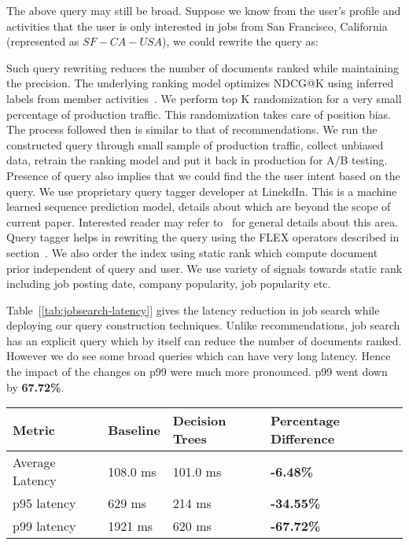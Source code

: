 
The above query may still be broad. Suppose we know from the user's profile and
activities that the user is only interested in jobs from San Francisco,
California (represented as $SF-CA-USA$), we could rewrite the query as:


Such query rewriting reduces the number of documents ranked while maintaining
the precision. The underlying ranking model optimizes NDCG@K using inferred
labels from member activities~\cite{liget}. We perform top K randomization for
a very small percentage of production traffic. This randomization takes care of
position bias. The process followed then is similar to that of recommendations.
We run the constructed query through small sample of production traffic,
collect unbiased data, retrain the ranking model and put it back in production
for A/B testing. Presence of query also implies that we could find the the user
intent based on the query. We use proprietary query tagger developer at
LinekdIn. This is a machine learned sequence prediction model, details about
which are beyond the scope of current paper. Interested reader may refer to~\cite{ashaolu2014query}  
for general details about this area. Query tagger helps in rewriting the query
using the FLEX operators described in section~\cite{ref:wand}. We also order
the index using static rank which compute document prior independent of query
and user. We use variety of signals towards static rank including job posting
date, company popularity, job popularity etc.


Table~[\ref{tab:jobsearch-latency}] gives the latency reduction in job search
while deploying our query construction techniques. Unlike recommendations, 
job search has an explicit query which by itself can reduce the number of documents ranked.
However we do see some broad queries which can have very long latency. 
Hence the impact of the changes on p99 were much more pronounced. p99 went down
by {\bf 67.72\%}. 

\begin{table*}
\centering
\caption{Impact of Query Construction on Job Search Latency}
\begin{tabular}{|l|l|l|l|} \hline
Metric&Baseline&Decision Trees&Percentage Difference \\ \hline
Average Latency& 108.0 ms& 101.0  ms& \bf{-6.48\%} \\ \hline
p95 latency& 629 ms& 214  ms& \bf{-34.55\%} \\ \hline
p99 latency& 1921 ms&620  ms& \bf{-67.72\%} \\ \hline
\end{tabular}
\label{tab:jobsearch-latency}
\end{table*}
